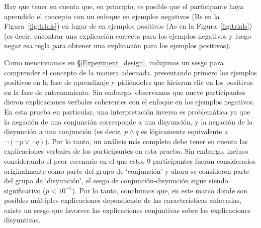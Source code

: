 Hay que tener en cuenta que, en principio, es posible que el participante haya aprendido el concepto con un enfoque en ejemplos negativos ({\sf B}s en la Figura~\ref{fig:trials}) en lugar de en ejemplos positivos ({\sf A}s en la Figura~\ref{fig:trials}) (es decir, encontrar una explicación correcta para los ejemplos negativos y luego negar esa regla para obtener una explicación para los ejemplos positivos).

Como mencionamos en \S\ref{Experiment_design}, indujimos un sesgo para comprender el concepto de la manera adecuada, presentando primero los ejemplos positivos en la fase de aprendizaje y pidiéndoles que hicieran clic en los positivos en la fase de entrenamiento. Sin embargo, observamos que nueve participantes dieron explicaciones verbales coherentes con el enfoque en los ejemplos negativos. En esta prueba en particular, una interpretación inversa es problemática ya que la negación de una conjunción corresponde a una disyunción, y la negación de la disyunción a una conjunción (es decir, $ p \land q $ es lógicamente equivalente a $ \lnot (\lnot p \lor \lnot q) $). Por lo tanto, un análisis más completo debe tener en cuenta las explicaciones verbales de los participantes en esta prueba. Sin embargo, incluso considerando el peor escenario en el que estos 9 participantes fueran considerados originalmente como parte del grupo de  `conjunción' y ahora se consideren parte del grupo de `disyunción', el sesgo de conjunción-disyunción sigue siendo significativo ($ p<10^{-7} $). Por lo tanto, concluimos que, en este marco donde son posibles múltiples explicaciones dependiendo de las características enfocadas, existe un sesgo que favorece las explicaciones conjuntivas sobre las explicaciones disyuntivas.

